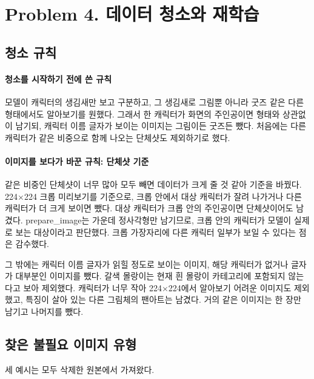 \documentclass[11pt]{article}
\begin{document}
\section*{Problem 4. 데이터 청소와 재학습}

\subsection*{청소 규칙}
\paragraph{청소를 시작하기 전에 쓴 규칙}
모델이 캐릭터의 생김새만 보고 구분하고, 그 생김새로 그림뿐 아니라 굿즈
같은 다른 형태에서도 알아보기를 원했다. 그래서 한 캐릭터가 화면의 주인공이면
형태와 상관없이 남기되, 캐릭터 이름 글자가 보이는 이미지는 그림이든 굿즈든
뺐다. 처음에는 다른 캐릭터가 같은 비중으로 함께 나오는 단체샷도 제외하기로 했다.

\paragraph{이미지를 보다가 바꾼 규칙: 단체샷 기준}
같은 비중인 단체샷이 너무 많아 모두 빼면 데이터가 크게 줄 것 같아 기준을
바꿨다. 224×224 크롭 미리보기를 기준으로, 크롭 안에서 대상 캐릭터가 잘려
나가거나 다른 캐릭터가 더 크게 보이면 뺐다. 대상 캐릭터가 크롭 안의 주인공이면
단체샷이어도 남겼다. prepare\_image는 가운데 정사각형만 남기므로, 크롭 안의
캐릭터가 모델이 실제로 보는 대상이라고 판단했다. 크롭 가장자리에 다른 캐릭터
일부가 보일 수 있다는 점은 감수했다.

그 밖에는 캐릭터 이름 글자가 읽힐 정도로 보이는 이미지, 해당 캐릭터가 없거나
글자가 대부분인 이미지를 뺐다. 갈색 몰랑이는 현재 흰 몰랑이 카테고리에
포함되지 않는다고 보아 제외했다. 캐릭터가 너무 작아 224×224에서 알아보기
어려운 이미지도 제외했고, 특징이 살아 있는 다른 그림체의 팬아트는 남겼다.
거의 같은 이미지는 한 장만 남기고 나머지를 뺐다.

\subsection*{찾은 불필요 이미지 유형}
세 예시는 모두 삭제한 원본에서 가져왔다.
\end{document}
